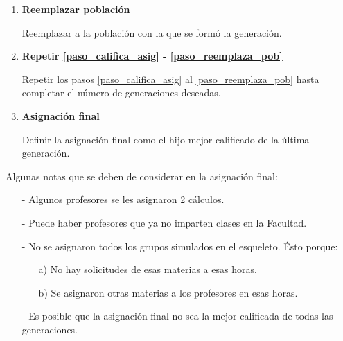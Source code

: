\begin{enumerate}
\item \textbf{Reemplazar población} \label{paso_reemplaza_pob}

Reemplazar a la población con la que se formó la generación.

\item \textbf{Repetir \ref{paso_califica_asig} - \ref{paso_reemplaza_pob}}

Repetir los pasos \ref{paso_califica_asig} al \ref{paso_reemplaza_pob} hasta completar el número de generaciones deseadas.

\item \textbf{Asignación final}

Definir la asignación final como el hijo mejor calificado de la última generación.
\end{enumerate}


Algunas notas que se deben de considerar en la asignación final:

\begin{itemize}
\item[-] Algunos profesores se les asignaron 2 cálculos.

\item[-] Puede haber profesores que ya no imparten clases en la Facultad.

\item[-] No se asignaron todos los grupos simulados en el esqueleto. Ésto porque:

\begin{itemize}
\item[a)] No hay solicitudes de esas materias a esas horas.

\item[b)] Se asignaron otras materias a los profesores en esas horas.
\end{itemize}

\item[-] Es posible que la asignación final no sea la mejor calificada de todas las generaciones.
\end{itemize}


